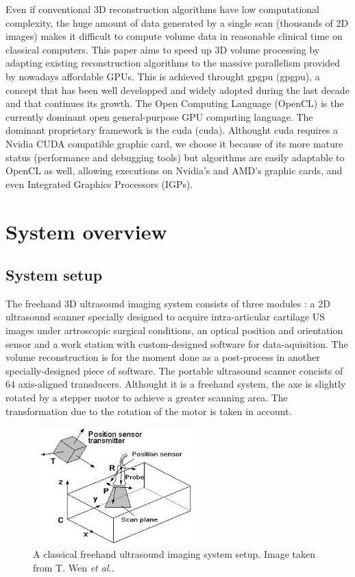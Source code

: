 \documentclass[12pt,journal,compsoc]{IEEEtran}
\begin{document}
Even if conventional 3D reconstruction algorithms have low computational complexity, the huge amount of data generated by a single scan (thousands of 2D images) makes it difficult to compute volume data in reasonable clinical time on classical computers.
This paper aims to speed up 3D volume processing by adapting existing reconstruction algorithms to the massive parallelism provided by nowadays affordable GPUs. This is achieved throught \acl{gpgpu} (\ac{gpgpu}), a concept that has been well developped and widely adopted during the last decade and that continues its growth.
The Open Computing Language (OpenCL) is the currently dominant open general-purpose GPU computing language. The dominant proprietary framework is the \acl{cuda} (\ac{cuda}).
Althought \ac{cuda} requires a Nvidia CUDA compatible graphic card, we choose it because of its more mature status (performance and debugging tools) but algorithms are easily adaptable to OpenCL as well, allowing executions on Nvidia's and AMD's graphic cards, and even Integrated Graphics Processors (IGPs).

\section{System overview}

\subsection{System setup}

The freehand 3D ultrasound imaging system consists of three modules : a 2D ultrasound scanner specially designed to acquire intra-articular cartilage US images under artroscopic surgical conditions, an optical position and orientation sensor and a work station with custom-designed software for data-aquisition. The volume reconstruction is for the moment done as a post-process in another specially-designed piece of software.
The portable ultrasound scanner concists of 64 axis-aligned transducers. Althought it is a freehand system, the axe is slightly rotated by a stepper motor to achieve a greater scanning area. The transformation due to the rotation of the motor is taken in account.

\begin{figure}[!h]
\centering
\includegraphics[width=2.5in]{freehand}
\caption{A classical freehand ultrasound imaging system setup. Image taken from T. Wen \textit{et al.}\cite{2}.}
\label{fig_1}
\end{figure}
\end{document}
